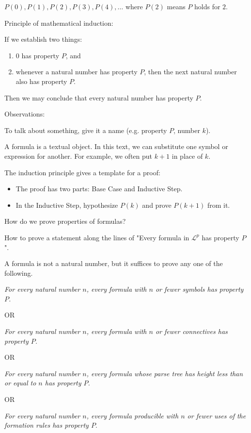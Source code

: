 \documentclass{article}
\begin{document}
$P(0), P(1), P(2), P(3), P(4), \ldots$ where $P(2)$ means $P$ holds for $2$. 

Principle of mathematical induction:

If we establish two things:
\begin{enumerate}
    \item $0$ has property $P$, and
    \item whenever a natural number has property $P$, then the next natural number also has property $P$.
\end{enumerate}

Then we may conclude that every natural number has property $P$. 

Observations:

To talk about something, give it a name (e.g. property $P$, number $k$). 

A formula is a textual object. In this text, we can substitute one symbol or expression for another. For example, we often put $k+1$ in place of $k$. 

The induction principle gives a template for a proof:
\begin{itemize}
    \item The proof has two parts: Base Case and Inductive Step.
    \item In the Inductive Step, hypothesize $P(k)$ and prove $P(k+1)$ from it. 
\end{itemize}

 How do we prove properties of formulas?

 How to prove a statement along the lines of "Every formula in $\mathcal{L}^p$ has property $P$". 

 A formula is not a natural number, but it suffices to prove any one of the following. 

\textit{For every natural number $n$, every formula with $n$ or fewer symbols has property $P$.} 

OR

\textit{For every natural number $n$, every formula with $n$ or fewer connectives has property $P$.}

OR

\textit{For every natural number $n$, every formula whose parse tree has height less than or equal to $n$ has property $P$.}

OR

\textit{For every natural number $n$, every formula producible with $n$ or fewer uses of the formation rules has property $P$}.
\end{document}
